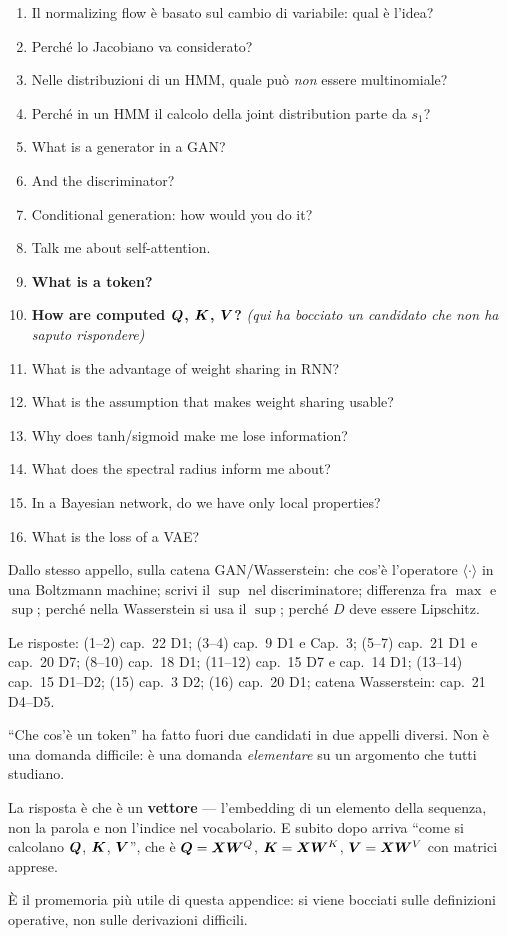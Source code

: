 \begin{tcolorbox}[mywarn, title={Domande verbatim --- giornata del 3 luglio 2026}]
\begin{enumerate}
  \item Il normalizing flow è basato sul cambio di variabile: qual è l'idea?
  \item Perché lo Jacobiano va considerato?
  \item Nelle distribuzioni di un HMM, quale può \emph{non} essere multinomiale?
  \item Perché in un HMM il calcolo della joint distribution parte da $s_1$?
  \item What is a generator in a GAN?
  \item And the discriminator?
  \item Conditional generation: how would you do it?
  \item Talk me about self-attention.
  \item \textbf{What is a token?}
  \item \textbf{How are computed $\bm{Q}$, $\bm{K}$, $\bm{V}$?} \emph{(qui ha bocciato un candidato che non ha saputo rispondere)}
  \item What is the advantage of weight sharing in RNN?
  \item What is the assumption that makes weight sharing usable?
  \item Why does tanh/sigmoid make me lose information?
  \item What does the spectral radius inform me about?
  \item In a Bayesian network, do we have only local properties?
  \item What is the loss of a VAE?
\end{enumerate}

\medskip
Dallo stesso appello, sulla catena GAN/Wasserstein: che cos'è l'operatore $\langle\cdot\rangle$ in una Boltzmann machine; scrivi il $\sup$ nel discriminatore; differenza fra $\max$ e $\sup$; perché nella Wasserstein si usa il $\sup$; perché $D$ deve essere Lipschitz.
\end{tcolorbox}

\noindent Le risposte: (1--2) cap.~22 D1; (3--4) cap.~9 D1 e Cap.~3; (5--7) cap.~21 D1 e cap.~20 D7; (8--10) cap.~18 D1; (11--12) cap.~15 D7 e cap.~14 D1; (13--14) cap.~15 D1--D2; (15) cap.~3 D2; (16) cap.~20 D1; catena Wasserstein: cap.~21 D4--D5.

\begin{tcolorbox}[mybox, title={La domanda 9 merita una riga a sé}]
``Che cos'è un token'' ha fatto fuori due candidati in due appelli diversi. Non è una domanda difficile: è una domanda \emph{elementare} su un argomento che tutti studiano.

La risposta è che è un \textbf{vettore} --- l'embedding di un elemento della sequenza, non la parola e non l'indice nel vocabolario. E subito dopo arriva ``come si calcolano $\bm{Q}$, $\bm{K}$, $\bm{V}$'', che è $\bm{Q} = \bm{X}\bm{W}^Q$, $\bm{K} = \bm{X}\bm{W}^K$, $\bm{V} = \bm{X}\bm{W}^V$ con matrici apprese.

È il promemoria più utile di questa appendice: si viene bocciati sulle definizioni operative, non sulle derivazioni difficili.
\end{tcolorbox}
